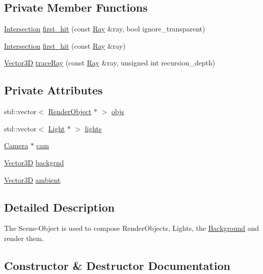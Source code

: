 \subsection*{Private Member Functions}
\begin{DoxyCompactItemize}
\item 
\hyperlink{classIntersection}{Intersection} \hyperlink{classScene_a671595e773bd4336c0fa67186aff609d}{first\+\_\+hit} (const \hyperlink{classRay}{Ray} \&ray, bool ignore\+\_\+transparent)
\item 
\hyperlink{classIntersection}{Intersection} \hyperlink{classScene_a726867ff812fd8776fe0b4319538e9e7}{first\+\_\+hit} (const \hyperlink{classRay}{Ray} \&ray)
\item 
\hyperlink{classVector3D}{Vector3D} \hyperlink{classScene_a1d230edebbee2bd667875fbdc76077d5}{trace\+Ray} (const \hyperlink{classRay}{Ray} \&ray, unsigned int recursion\+\_\+depth)
\end{DoxyCompactItemize}
\subsection*{Private Attributes}
\begin{DoxyCompactItemize}
\item 
std\+::vector$<$ \hyperlink{classRenderObject}{Render\+Object} $\ast$ $>$ \hyperlink{classScene_a37361b6054643b62fcb8e6b7c828e5dd}{objs}
\item 
std\+::vector$<$ \hyperlink{classLight}{Light} $\ast$ $>$ \hyperlink{classScene_a4ecc3182a80435e1c4dfbe1b20e559bd}{lights}
\item 
\hyperlink{classCamera}{Camera} $\ast$ \hyperlink{classScene_aeac676eac579e2831faae0eedaa8db8d}{cam}
\item 
\hyperlink{classVector3D}{Vector3D} \hyperlink{classScene_ac745fba97d639cebcf0e8fbf59967da2}{backgrnd}
\item 
\hyperlink{classVector3D}{Vector3D} \hyperlink{classScene_a284ce5b2aeb47c64d6712d9748229c47}{ambient}
\end{DoxyCompactItemize}


\subsection{Detailed Description}
The Scene-\/\+Object is used to compose Render\+Objects, Lights, the \hyperlink{classBackground}{Background} and render them. 

\subsection{Constructor \& Destructor Documentation}
